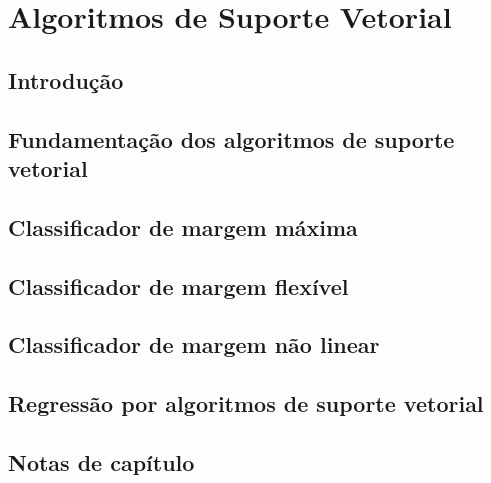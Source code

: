 \documentclass[
]{latex/krantz}
\theoremstyle{definition}
\theoremstyle{definition}
\theoremstyle{definition}
\theoremstyle{definition}
\theoremstyle{remark}
\begin{document}
\hypertarget{algoritmos-de-suporte-vetorial}{%
\chapter{Algoritmos de Suporte Vetorial}\label{algoritmos-de-suporte-vetorial}}

\hypertarget{introduuxe7uxe3o-8}{%
\section{Introdução}\label{introduuxe7uxe3o-8}}

\hypertarget{fundamentauxe7uxe3o-dos-algoritmos-de-suporte-vetorial}{%
\section{Fundamentação dos algoritmos de suporte vetorial}\label{fundamentauxe7uxe3o-dos-algoritmos-de-suporte-vetorial}}

\hypertarget{classificador-de-margem-muxe1xima}{%
\section{Classificador de margem máxima}\label{classificador-de-margem-muxe1xima}}

\hypertarget{classificador-de-margem-flexuxedvel}{%
\section{Classificador de margem flexível}\label{classificador-de-margem-flexuxedvel}}

\hypertarget{classificador-de-margem-nuxe3o-linear}{%
\section{Classificador de margem não linear}\label{classificador-de-margem-nuxe3o-linear}}

\hypertarget{regressuxe3o-por-algoritmos-de-suporte-vetorial}{%
\section{Regressão por algoritmos de suporte vetorial}\label{regressuxe3o-por-algoritmos-de-suporte-vetorial}}

\hypertarget{notas-de-capuxedtulo-8}{%
\section{Notas de capítulo}\label{notas-de-capuxedtulo-8}}
\end{document}
